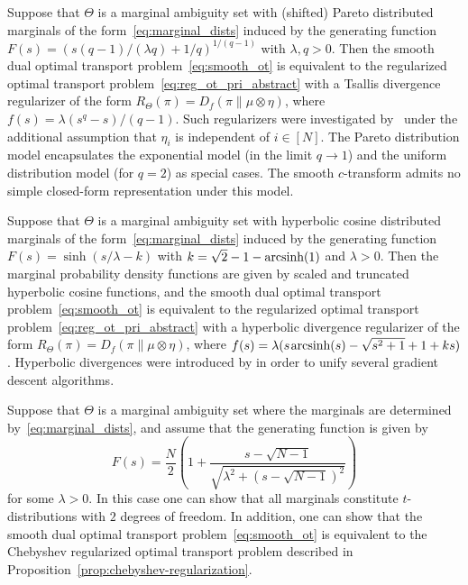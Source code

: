 \documentclass[11pt, a4paper, oneside, reqno]{article}
\begin{document}
	\begin{example}
		\label{ex:pareto}
		Suppose that $\Theta$ is a marginal ambiguity set with (shifted) Pareto distributed marginals of the form~\eqref{eq:marginal_dists} induced by the generating function
		$F(s) = (s (q-1) / (\lambda q)+1/q)^{1/(q-1)}$ with $\lambda,q>0$.
		Then the smooth dual optimal transport problem~\eqref{eq:smooth_ot} is equivalent to the regularized optimal transport problem~\eqref{eq:reg_ot_pri_abstract} with a Tsallis divergence regularizer of the form $R_\Theta(\pi) = D_f(\pi \| \mu \otimes \eta)$, where $f(s) = \lambda (s^q - s)/(q-1)$. Such regularizers were  investigated by~\citep{muzellec2017tsallis} under the additional assumption that $\eta_i$ is independent of $i\in[N]$. The Pareto distribution model encapsulates the exponential model (in the limit $q\to 1$) and the uniform distribution model (for $q=2$) as special cases. The smooth $c$-transform admits no simple closed-form representation under this model.
	\end{example}
	
	\begin{example}
		\label{ex:hyperbolic}
	Suppose that $\Theta$ is a marginal ambiguity set with hyperbolic cosine distributed marginals of the form~\eqref{eq:marginal_dists} induced by the generating function $F(s) = \sinh(s/\lambda - k)$ with $k = \sqrt{2} - 1 - \textrm{arcsinh}(1)$ and $\lambda > 0$. Then the marginal probability density functions are given by scaled and truncated hyperbolic cosine functions, and the smooth dual optimal transport problem~\eqref{eq:smooth_ot} is equivalent to the regularized optimal transport problem~\eqref{eq:reg_ot_pri_abstract} with a hyperbolic divergence regularizer of the form $R_\Theta(\pi) = D_f(\pi \| \mu \otimes \eta)$, where $f(s) = \lambda(s \hspace{0.1em} \textrm{arcsinh}(s) - \sqrt{s^2 + 1} + 1 + ks)$. Hyperbolic divergences were introduced by \citet{ghai2019exponentiated} in order to unify several gradient descent algorithms.
	\end{example} 
	
	\begin{example}
	    \label{ex:t-distribution}
		Suppose that $\Theta$ is a marginal ambiguity set where the marginals are determined by~\eqref{eq:marginal_dists}, and assume that the generating function is given by
	    \[
	        F(s) = \frac{N}{2}\left(1 + \frac{s - \sqrt{N-1}} {\sqrt{\lambda^2 + (s - \sqrt{N-1})^{2}}}\right)
	    \]
	    for some $\lambda > 0$. In this case one can show that all marginals constitute $t$-distributions with $2$ degrees of freedom. In addition, one can show that the smooth dual optimal transport problem~\eqref{eq:smooth_ot} is equivalent to the Chebyshev regularized optimal transport problem described in Proposition~\ref{prop:chebyshev-regularization}.
	\end{example}
	
\end{document}
